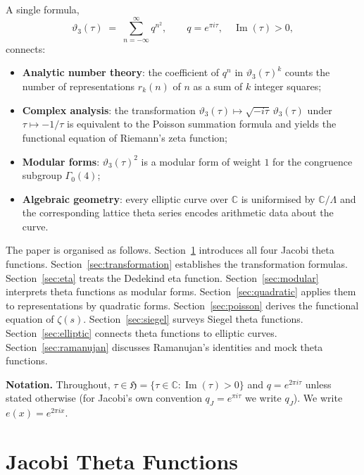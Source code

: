 \documentclass[12pt,a4paper]{amsart}
\theoremstyle{definition}
\begin{document}
A single formula,
\begin{equation}\label{eq:theta3basic}
  \vartheta_3(\tau) \;=\; \sum_{n=-\infty}^{\infty} q^{n^2},
  \qquad q = e^{\pi i \tau},\quad \operatorname{Im}(\tau)>0,
\end{equation}
connects:
\begin{itemize}[leftmargin=2em]
  \item \textbf{Analytic number theory}: the coefficient of $q^n$ in
        $\vartheta_3(\tau)^k$ counts the number of representations
        $r_k(n)$ of $n$ as a sum of $k$ integer squares;
  \item \textbf{Complex analysis}: the transformation
        $\vartheta_3(\tau) \mapsto \sqrt{-i\tau}\,\vartheta_3(\tau)$
        under $\tau \mapsto -1/\tau$ is equivalent to the Poisson
        summation formula and yields the functional equation of
        Riemann's zeta function;
  \item \textbf{Modular forms}: $\vartheta_3(\tau)^2$ is a modular form
        of weight $1$ for the congruence subgroup $\Gamma_0(4)$;
  \item \textbf{Algebraic geometry}: every elliptic curve over $\mathbb{C}$
        is uniformised by $\mathbb{C}/\Lambda$ and the corresponding
        lattice theta series encodes arithmetic data about the curve.
\end{itemize}

The paper is organised as follows.
Section~\ref{sec:jacobi} introduces all four Jacobi theta functions.
Section~\ref{sec:transformation} establishes the transformation formulas.
Section~\ref{sec:eta} treats the Dedekind eta function.
Section~\ref{sec:modular} interprets theta functions as modular forms.
Section~\ref{sec:quadratic} applies them to representations by quadratic forms.
Section~\ref{sec:poisson} derives the functional equation of $\zeta(s)$.
Section~\ref{sec:siegel} surveys Siegel theta functions.
Section~\ref{sec:elliptic} connects theta functions to elliptic curves.
Section~\ref{sec:ramanujan} discusses Ramanujan's identities and mock theta functions.

\medskip
\noindent\textbf{Notation.}
Throughout, $\tau \in \mathfrak{H} = \{\tau \in \mathbb{C} : \operatorname{Im}(\tau)>0\}$
and $q = e^{2\pi i\tau}$ unless stated otherwise (for Jacobi's own convention
$q_J = e^{\pi i \tau}$ we write $q_J$).
We write $e(x) = e^{2\pi i x}$.

\section{Jacobi Theta Functions}\label{sec:jacobi}
\end{document}
